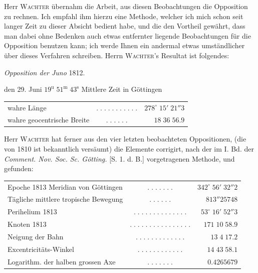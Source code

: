 \par\indent Herr \textsc{Wachter} übernahm die Arbeit, aus diesen Beobachtungen die Opposition
zu rechnen. Ich empfahl ihm hierzu eine Methode, welcher ich mich schon
seit langer Zeit zu dieser Absicht bedient habe, und die den Vortheil
gewährt, dass man dabei ohne Bedenken auch etwas entfernter liegende
Beobachtungen für die Opposition benutzen kann; ich werde Ihnen ein
andermal etwas umständlicher über dieses Verfahren schreiben. Herrn
\textsc{Wachter}'s Resultat ist folgendes:

\begin{center}
\emph{Opposition der Juno} 1812.
\end{center}

den 29. Juni $19^{\mathrm u}\;51^{\mathrm m}\;43^{\mathrm s}$ Mittlere Zeit in Göttingen

\begin{center}\fontsize{10}{12}\selectfont\setlength{\tabcolsep}{2pt}\renewcommand{\arraystretch}{1.15}\begin{tabular}{lcr}
wahre Länge & $.\;.\;.\;.\;.\;.\;.\;.\;.\;.\;.$ & $278^\circ\;15'\;21''3$\\
wahre geocentrische Breite & $.\;.\;.\;.\;.\;.$ & $18\;36\;56.9$\\
\end{tabular}\end{center}

\par\indent Herr \textsc{Wachter} hat ferner aus den vier letzten beobachteten Oppositionen,
(die von 1810 ist bekanntlich versäumt) die Elemente corrigirt, nach der
im I. Bd. der \emph{Comment. Nov. Soc. Sc. Götting.} [S. 1. d. B.]
vorgetragenen Methode, und gefunden:
\begin{center}\fontsize{9}{11}\selectfont\setlength{\tabcolsep}{2pt}\renewcommand{\arraystretch}{1.15}\begin{tabular}{lcr}
Epoche 1813 Meridian von Göttingen & $.\;.\;.\;.\;.\;.\;.$ & $342^\circ\;56'\;32''2$\\
Tägliche mittlere tropische Bewegung & $.\;.\;.\;.\;.\;.$ & $813''25748$\\
Perihelium 1813 & $.\;.\;.\;.\;.\;.\;.\;.\;.\;.\;.\;.\;.\;.$ & $53^\circ\;16'\;52''3$\\
Knoten 1813 & $.\;.\;.\;.\;.\;.\;.\;.\;.\;.\;.\;.\;.\;.\;.\;.$ & $171\;10\;58.9$\\
Neigung der Bahn & $.\;.\;.\;.\;.\;.\;.\;.\;.\;.\;.\;.\;.$ & $13\;4\;17.2$\\
Excentricitäts-Winkel & $.\;.\;.\;.\;.\;.\;.\;.\;.\;.\;.\;.$ & $14\;43\;58.1$\\
Logarithm. der halben grossen Axe & $.\;.\;.\;.\;.\;.\;.$ & $0.4265679$\\
\end{tabular}\end{center}

